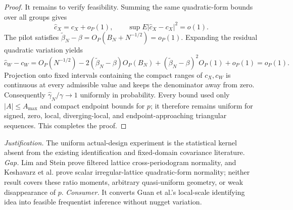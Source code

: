 \documentclass{article}
\begin{document}
\begin{proof}
It remains to verify feasibility.  Summing the same quadratic-form bounds over all groups gives
\[
 \widehat c_X=c_X+o_P(1),
 \qquad \sup E|\widehat c_X-c_X|^2=o(1).
\]
The pilot satisfies \(\widetilde\beta_N-\beta=O_P(B_N+N^{-1/2})=o_P(1)\).  Expanding the residual quadratic variation yields
\[
 \widehat c_W-c_W
 =O_P(N^{-1/2})
 -2(\widetilde\beta_N-\beta)O_P(B_N)
 +(\widetilde\beta_N-\beta)^2O_P(1)+o_P(1)=o_P(1).
\]
Projection onto fixed intervals containing the compact ranges of \(c_X,c_W\) is continuous at every admissible value and keeps the denominator away from zero.  Consequently \(\widehat\gamma_N/\gamma\to1\) uniformly in probability.  Every bound used only \(|A|\le A_{\max}\) and compact endpoint bounds for \(p\); it therefore remains uniform for signed, zero, local, diverging-local, and endpoint-approaching triangular sequences.  This completes the proof.
\end{proof}
\par\smallskip\noindent \textit{Justification.} The uniform actual-design experiment is the statistical kernel absent from the existing identification and fixed-domain covariance literature. \textit{Gap.} Lim and Stein prove filtered lattice cross-periodogram normality, and Keshavarz et al. prove scalar irregular-lattice quadratic-form normality; neither result covers these ratio moments, arbitrary quasi-uniform geometry, or weak disappearance of \(p\). \textit{Consumer.} It converts Guan et al.'s local-scale identifying idea into feasible frequentist inference without nugget variation.
\end{document}
